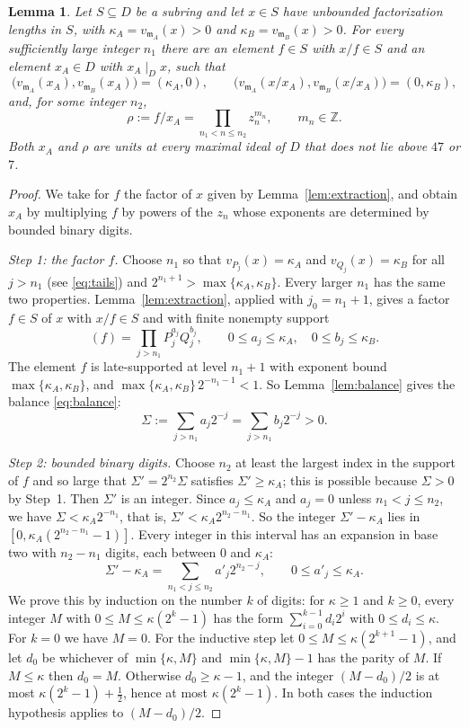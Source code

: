 \documentclass[11pt]{article}
\theoremstyle{plain}
\newtheorem{lemma}[theorem]{Lemma}
\theoremstyle{definition}
\theoremstyle{remark}
\newcommand{\Z}{\mathbb Z}
\newcommand{\EA}{\mathfrak m_A}
\newcommand{\EB}{\mathfrak m_B}
\begin{document}
\begin{lemma}\label{lem:split}
Let $S\subseteq D$ be a subring and let $x\in S$ have unbounded
factorization lengths in $S$, with $\kappa_A=v_{\EA}(x)>0$ and
$\kappa_B=v_{\EB}(x)>0$.  For every sufficiently large integer $n_1$ there
are an element $f\in S$ with $x/f\in S$ and an element $x_A\in D$ with
$x_A\mid_Dx$, such that
\[
 \bigl(v_{\EA}(x_A),v_{\EB}(x_A)\bigr)=(\kappa_A,0),\qquad
 \bigl(v_{\EA}(x/x_A),v_{\EB}(x/x_A)\bigr)=(0,\kappa_B),
\]
and, for some integer $n_2$,
\begin{equation}\label{eq:rho}
 \rho:=f/x_A=\prod_{n_1<n\leq n_2}z_n^{m_n},
 \qquad m_n\in\Z.
\end{equation}
Both $x_A$ and $\rho$ are units at every maximal ideal of $D$ that does
not lie above $47$ or $7$.
\end{lemma}
\begin{proof}
We take for $f$ the factor of $x$ given by Lemma~\ref{lem:extraction},
and obtain $x_A$ by multiplying $f$ by powers of the $z_n$ whose
exponents are determined by bounded binary digits.

\emph{Step 1: the factor $f$.}  Choose $n_1$ so that
$v_{P_j}(x)=\kappa_A$ and $v_{Q_j}(x)=\kappa_B$ for all $j>n_1$
(see \eqref{eq:tails}) and $2^{n_1+1}>\max\{\kappa_A,\kappa_B\}$.  Every
larger $n_1$ has the same two properties.  Lemma~\ref{lem:extraction},
applied with $j_0=n_1+1$, gives a factor $f\in S$ of $x$ with $x/f\in S$
and with finite nonempty support
\[
 (f)=\prod_{j>n_1}P_j^{a_j}Q_j^{b_j},
 \qquad 0\leq a_j\leq \kappa_A,\quad0\leq b_j\leq \kappa_B.
\]
The element $f$ is late-supported at level $n_1+1$ with exponent bound
$\max\{\kappa_A,\kappa_B\}$, and $\max\{\kappa_A,\kappa_B\}\,2^{-n_1-1}<1$.
So Lemma~\ref{lem:balance} gives the balance \eqref{eq:balance}:
\[
 \Sigma:=\sum_{j>n_1}a_j2^{-j}=\sum_{j>n_1}b_j2^{-j}>0.
\]

\emph{Step 2: bounded binary digits.}  Choose $n_2$ at least the largest
index in the support of $f$ and so large that $\Sigma'=2^{n_2}\Sigma$
satisfies $\Sigma'\geq\kappa_A$; this is possible because $\Sigma>0$
by Step~1.  Then $\Sigma'$ is an integer.  Since
$a_j\le\kappa_A$ and $a_j=0$ unless $n_1<j\le n_2$, we have
$\Sigma<\kappa_A2^{-n_1}$, that is, $\Sigma'<\kappa_A2^{n_2-n_1}$.  So
the integer $\Sigma'-\kappa_A$ lies in
$[0,\kappa_A(2^{n_2-n_1}-1)]$.  Every integer in this interval has an
expansion in base two with $n_2-n_1$ digits, each between $0$ and
$\kappa_A$:
\[
 \Sigma'-\kappa_A=\sum_{n_1<j\leq n_2}a'_j2^{n_2-j},\qquad
 0\leq a'_j\leq\kappa_A.
\]
We prove this by induction on the number $k$ of digits: for $\kappa\ge1$
and $k\ge0$, every integer $M$ with $0\le M\le\kappa(2^k-1)$ has the form
$\sum_{i=0}^{k-1}d_i2^i$ with $0\le d_i\le\kappa$.  For $k=0$ we have
$M=0$.  For the inductive step let $0\le M\le\kappa(2^{k+1}-1)$, and let
$d_0$ be whichever of $\min\{\kappa,M\}$ and $\min\{\kappa,M\}-1$ has the
parity of $M$.  If $M\le\kappa$ then $d_0=M$.  Otherwise
$d_0\ge\kappa-1$, and the integer $(M-d_0)/2$ is at most
$\kappa(2^k-1)+\tfrac12$, hence at most $\kappa(2^k-1)$.  In both cases
the induction hypothesis applies to $(M-d_0)/2$.


\end{proof}
\end{document}
